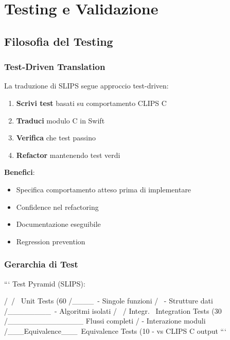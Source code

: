 
\chapter{Testing e Validazione}
\label{cap:testing}

\section{Filosofia del Testing}

\subsection{Test-Driven Translation}

La traduzione di SLIPS segue approccio test-driven:

\begin{enumerate}
\item \textbf{Scrivi test} basati su comportamento CLIPS C
\item \textbf{Traduci} modulo C in Swift
\item \textbf{Verifica} che test passino
\item \textbf{Refactor} mantenendo test verdi
\end{enumerate}

\textbf{Benefici}:
\begin{itemize}
\item Specifica comportamento atteso prima di implementare
\item Confidence nel refactoring
\item Documentazione eseguibile
\item Regression prevention
\end{itemize}

\subsection{Gerarchia di Test}

```
Test Pyramid (SLIPS):

         /\
        /  \     Unit Tests (60%
       /____\    - Singole funzioni
      /      \   - Strutture dati
     /________\  - Algoritmi isolati
    /          \
   /   Integr.  \ Integration Tests (30%
  /______________\- Flussi completi
 /                - Interazione moduli
/___Equivalence___\ Equivalence Tests (10%
                    - vs CLIPS C output
```

